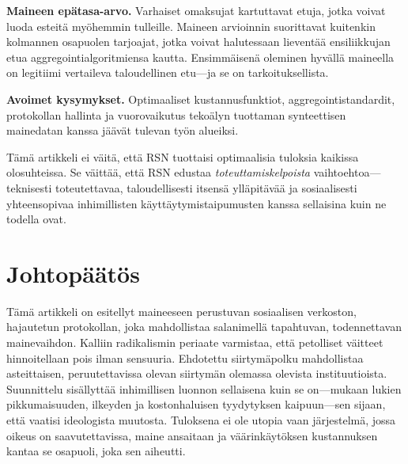 \documentclass[11pt,a4paper,twocolumn]{article}
\begin{document}
\textbf{Maineen epätasa-arvo.} Varhaiset omaksujat kartuttavat etuja, jotka voivat luoda esteitä myöhemmin tulleille. Maineen arvioinnin suorittavat kuitenkin kolmannen osapuolen tarjoajat, jotka voivat halutessaan lieventää ensiliikkujan etua aggregointialgoritmiensa kautta. Ensimmäisenä oleminen hyvällä maineella on legitiimi vertaileva taloudellinen etu---ja se on tarkoituksellista.

\textbf{Avoimet kysymykset.} Optimaaliset kustannusfunktiot, aggregointistandardit, protokollan hallinta ja vuorovaikutus tekoälyn tuottaman synteettisen mainedatan kanssa jäävät tulevan työn alueiksi.

Tämä artikkeli ei väitä, että RSN tuottaisi optimaalisia tuloksia kaikissa olosuhteissa. Se väittää, että RSN edustaa \emph{toteuttamiskelpoista} vaihtoehtoa---teknisesti toteutettavaa, taloudellisesti itsensä ylläpitävää ja sosiaalisesti yhteensopivaa inhimillisten käyttäytymistaipumusten kanssa sellaisina kuin ne todella ovat.

\section{Johtopäätös}

Tämä artikkeli on esitellyt maineeseen perustuvan sosiaalisen verkoston, hajautetun protokollan, joka mahdollistaa salanimellä tapahtuvan, todennettavan mainevaihdon. Kalliin radikalismin periaate varmistaa, että petolliset väitteet hinnoitellaan pois ilman sensuuria. Ehdotettu siirtymäpolku mahdollistaa asteittaisen, peruutettavissa olevan siirtymän olemassa olevista instituutioista. Suunnittelu sisällyttää inhimillisen luonnon sellaisena kuin se on---mukaan lukien pikkumaisuuden, ilkeyden ja kostonhaluisen tyydytyksen kaipuun---sen sijaan, että vaatisi ideologista muutosta. Tuloksena ei ole utopia vaan järjestelmä, jossa oikeus on saavutettavissa, maine ansaitaan ja väärinkäytöksen kustannuksen kantaa se osapuoli, joka sen aiheutti.


\end{document}
